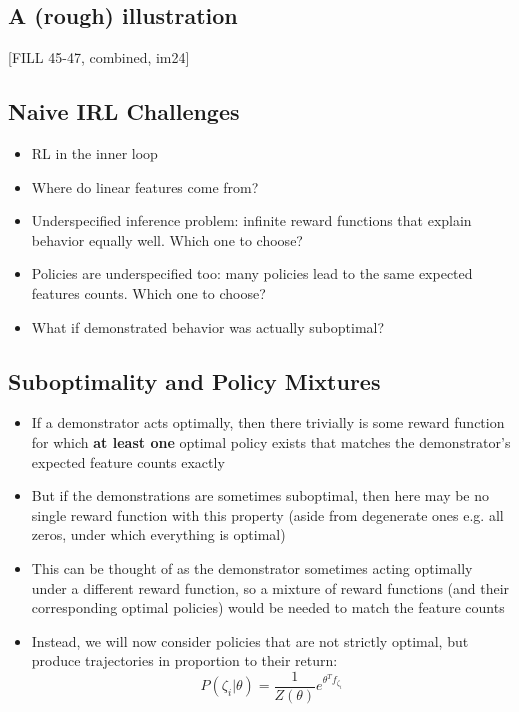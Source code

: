 \documentclass[10pt]{article}
\begin{document}
\subsection*{A (rough) illustration}
[FILL 45-47, combined, im24]

\subsection*{Naive IRL Challenges}
\begin{itemize}
	\item RL in the inner loop
	\item Where do linear features come from?
	\item Underspecified inference problem: infinite reward functions that explain behavior equally well.  Which one to choose?
	\item Policies are underspecified too: many policies lead to the same expected features counts.  Which one to choose?
	\item What if demonstrated behavior was actually suboptimal?
\end{itemize}

\subsection*{Suboptimality and Policy Mixtures}
\begin{itemize}
	\item If a demonstrator acts optimally, then there trivially is some reward function for which \textbf{at least one} optimal policy exists that matches the demonstrator's expected feature counts exactly
	\item But if the demonstrations are sometimes suboptimal, then here may be no single reward function with this property (aside from degenerate ones e.g. all zeros, under which everything is optimal)
	\item This can be thought of as the demonstrator sometimes acting optimally under a different reward function, so a mixture of reward functions (and their corresponding optimal policies) would be needed to match the feature counts
	\item Instead, we will now consider policies that are not strictly optimal, but produce trajectories in proportion to their return:
	\[P(\zeta_i | \theta) = \frac{1}{Z(\theta)} e^{\theta^T f_{\zeta_i}}\]
\end{itemize}
\end{document}
